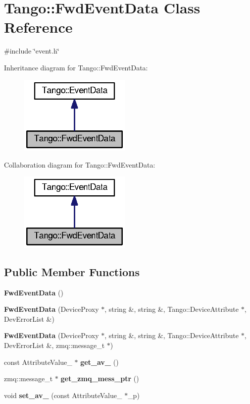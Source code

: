 \section{Tango\-:\-:Fwd\-Event\-Data Class Reference}
\label{classTango_1_1FwdEventData}


{\ttfamily \#include \char`\"{}event.\-h\char`\"{}}



Inheritance diagram for Tango\-:\-:Fwd\-Event\-Data\-:
\nopagebreak
\begin{figure}[H]
\begin{center}
\leavevmode
\includegraphics[width=154pt]{d2/d75/classTango_1_1FwdEventData__inherit__graph}
\end{center}
\end{figure}


Collaboration diagram for Tango\-:\-:Fwd\-Event\-Data\-:
\nopagebreak
\begin{figure}[H]
\begin{center}
\leavevmode
\includegraphics[width=154pt]{de/df7/classTango_1_1FwdEventData__coll__graph}
\end{center}
\end{figure}
\subsection*{Public Member Functions}
\begin{DoxyCompactItemize}
\item 
{\bf Fwd\-Event\-Data} ()
\item 
{\bf Fwd\-Event\-Data} (Device\-Proxy $\ast$, string \&, string \&, Tango\-::\-Device\-Attribute $\ast$, Dev\-Error\-List \&)
\item 
{\bf Fwd\-Event\-Data} (Device\-Proxy $\ast$, string \&, string \&, Tango\-::\-Device\-Attribute $\ast$, Dev\-Error\-List \&, zmq\-::message\-\_\-t $\ast$)
\item 
const Attribute\-Value\-\_ $\ast$ {\bf get\-\_\-av\-\_} ()
\item 
zmq\-::message\-\_\-t $\ast$ {\bf get\-\_\-zmq\-\_\-mess\-\_\-ptr} ()
\item 
void {\bf set\-\_\-av\-\_} (const Attribute\-Value\-\_ $\ast$\-\_\-p)
\end{DoxyCompactItemize}
